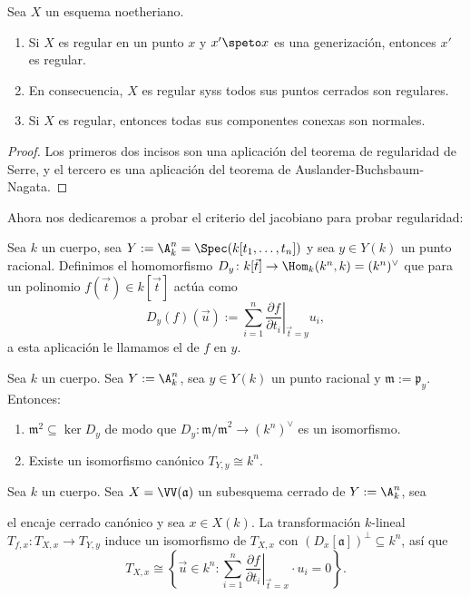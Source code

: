 \begin{prop}\label{thm:regularity_under_gez}
	Sea $X$ un esquema noetheriano.
	\begin{enumerate}
		\item Si $X$ es regular en un punto $x$ y $x' \speto x$ es una generización,
			entonces $x'$ es regular.
		\item En consecuencia, $X$ es regular syss todos sus puntos cerrados son regulares.
		\item Si $X$ es regular, entonces todas sus componentes conexas son normales.
	\end{enumerate}
\end{prop}
\begin{proof}
	Los primeros dos incisos son una aplicación del teorema de regularidad de Serre,
	y el tercero es una aplicación del teorema de Auslander-Buchsbaum-Nagata.
\end{proof}

Ahora nos dedicaremos a probar el criterio del jacobiano para probar regularidad:
\begin{mydef}
	Sea $k$ un cuerpo, sea $Y := \A^n_k = \Spec(k[t_1, \dots, t_n])$ y sea $y \in Y(k)$ un punto racional.
	Definimos el homomorfismo $D_y\colon k[\vec t] \to \Hom_k(k^n, k) = (k^n)^\vee$ que para un polinomio $f(\vec t) \in k[\vec t]$ actúa como
	$$ D_y(f)(\vec u) := \sum_{i=1}^{n} \left.\frac{\partial f}{\partial t_i}\right|_{\vec t = y} u_i, $$
	a esta aplicación le llamamos el  de $f$ en $y$.
\end{mydef}

\begin{lem}
	Sea $k$ un cuerpo.
	Sea $Y := \A^n_k$, sea $y \in Y(k)$ un punto racional y $\mathfrak{m} := \mathfrak{p}_y$. Entonces:
	\begin{enumerate}
		\item $\mathfrak{m}^2 \subseteq \ker D_y$ de modo que $D_y\colon \mathfrak{m/m}^2 \to (k^n)^\vee$ es un isomorfismo.
		\item Existe un isomorfismo canónico $T_{Y, y} \cong k^n$.
	\end{enumerate}
\end{lem}

\begin{prop}
	Sea $k$ un cuerpo.
	Sea $X = \VV(\mathfrak{a})$ un subesquema cerrado de $Y := \A^n_k$, sea 
	el encaje cerrado canónico y sea $x \in X(k)$.
	La transformación $k$-lineal $T_{f, x}\colon T_{X, x} \to T_{Y, y}$ induce un isomorfismo de $T_{X, x}$ con $(D_x[\mathfrak{a}])^\perp \subseteq k^n$,
	así que
	$$ T_{X, x} \cong \left\{ \vec u \in k^n : \sum_{i=1}^{n} \left. \frac{\partial f}{\partial t_i} \right|_{\vec t = x} \cdot u_i = 0 \right\}. $$
\end{prop}

